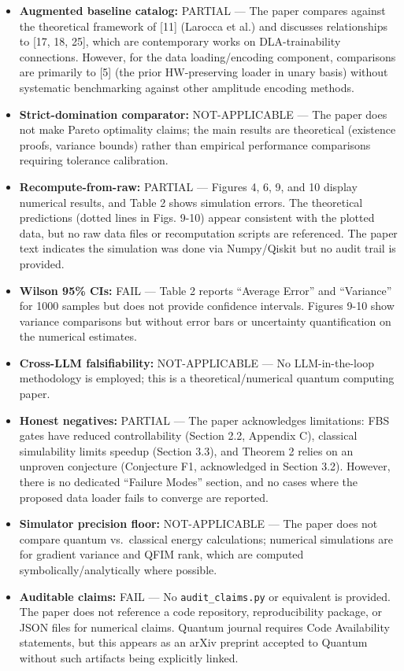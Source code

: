 \documentclass[10pt,letterpaper]{article}
\begin{document}
\begin{itemize}
\item[$\square$]
  \textbf{Augmented baseline catalog:} PARTIAL --- The paper compares against the theoretical framework of {[}11{]} (Larocca et al.) and discusses relationships to {[}17, 18, 25{]}, which are contemporary works on DLA-trainability connections. However, for the data loading/encoding component, comparisons are primarily to {[}5{]} (the prior HW-preserving loader in unary basis) without systematic benchmarking against other amplitude encoding methods.
\item[$\square$]
  \textbf{Strict-domination comparator:} NOT-APPLICABLE --- The paper does not make Pareto optimality claims; the main results are theoretical (existence proofs, variance bounds) rather than empirical performance comparisons requiring tolerance calibration.
\item[$\square$]
  \textbf{Recompute-from-raw:} PARTIAL --- Figures 4, 6, 9, and 10 display numerical results, and Table 2 shows simulation errors. The theoretical predictions (dotted lines in Figs. 9-10) appear consistent with the plotted data, but no raw data files or recomputation scripts are referenced. The paper text indicates the simulation was done via Numpy/Qiskit but no audit trail is provided.
\item[$\square$]
  \textbf{Wilson 95\% CIs:} FAIL --- Table 2 reports ``Average Error'' and ``Variance'' for 1000 samples but does not provide confidence intervals. Figures 9-10 show variance comparisons but without error bars or uncertainty quantification on the numerical estimates.
\item[$\square$]
  \textbf{Cross-LLM falsifiability:} NOT-APPLICABLE --- No LLM-in-the-loop methodology is employed; this is a theoretical/numerical quantum computing paper.
\item[$\square$]
  \textbf{Honest negatives:} PARTIAL --- The paper acknowledges limitations: FBS gates have reduced controllability (Section 2.2, Appendix C), classical simulability limits speedup (Section 3.3), and Theorem 2 relies on an unproven conjecture (Conjecture F1, acknowledged in Section 3.2). However, there is no dedicated ``Failure Modes'' section, and no cases where the proposed data loader fails to converge are reported.
\item[$\square$]
  \textbf{Simulator precision floor:} NOT-APPLICABLE --- The paper does not compare quantum vs.~classical energy calculations; numerical simulations are for gradient variance and QFIM rank, which are computed symbolically/analytically where possible.
\item[$\square$]
  \textbf{Auditable claims:} FAIL --- No \texttt{audit\_claims.py} or equivalent is provided. The paper does not reference a code repository, reproducibility package, or JSON files for numerical claims. Quantum journal requires Code Availability statements, but this appears as an arXiv preprint accepted to Quantum without such artifacts being explicitly linked.
\end{itemize}
\end{document}
